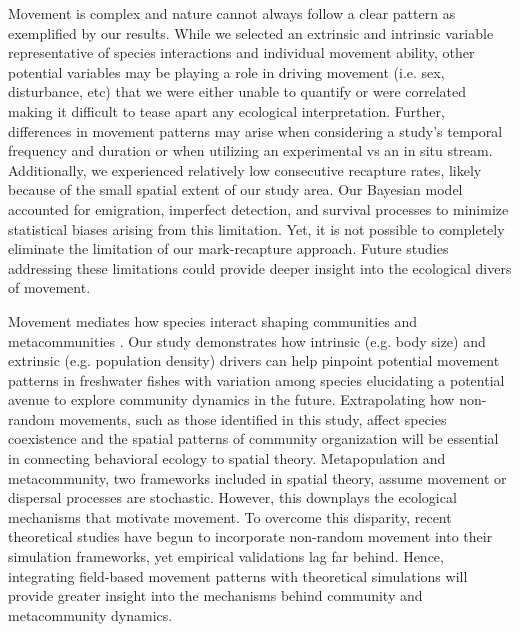 \documentclass[11pt, class=article, crop=false]{standalone}
\begin{document}
Movement is complex and nature cannot always follow a clear pattern as exemplified by our results. While we selected an extrinsic and intrinsic variable representative of species interactions and individual movement ability, other potential variables may be playing a role in driving movement (i.e. sex, disturbance, etc) that we were either unable to quantify or were correlated making it difficult to tease apart any ecological interpretation. Further, differences in movement patterns may arise when considering a study’s temporal frequency and duration or when utilizing an experimental vs an in situ stream. Additionally, we experienced relatively low consecutive recapture rates, likely because of the small spatial extent of our study area. Our Bayesian model accounted for emigration, imperfect detection, and survival processes to minimize statistical biases arising from this limitation. Yet, it is not possible to completely eliminate the limitation of our mark-recapture approach. Future studies addressing these limitations could provide deeper insight into the ecological divers of movement.

Movement mediates how species interact shaping communities and metacommunities \citep{schlagelMovementmediatedCommunityAssembly2020
}. Our study demonstrates how intrinsic (e.g. body size) and extrinsic (e.g. population density) drivers can help pinpoint potential movement patterns in freshwater fishes with variation among species elucidating a potential avenue to explore community dynamics in the future. Extrapolating how non-random movements, such as those identified in this study, affect species coexistence and the spatial patterns of community organization will be essential in connecting behavioral ecology to spatial theory. Metapopulation and metacommunity, two frameworks included in spatial theory, assume movement or dispersal processes are stochastic. However, this downplays the ecological mechanisms that motivate movement. To overcome this disparity, recent theoretical studies have begun to incorporate non-random movement into their simulation frameworks, yet empirical validations lag far behind. Hence, integrating field-based movement patterns with theoretical simulations will provide greater insight into the mechanisms behind community and metacommunity dynamics.


\end{document}
